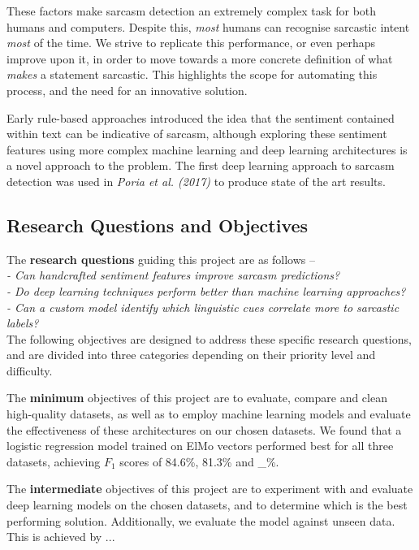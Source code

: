 \documentclass[12pt,a4paper]{article}
\begin{document}
These factors make sarcasm detection an extremely complex task for both humans and computers. Despite this, \textit{most} humans can recognise sarcastic intent \textit{most} of the time. We strive to replicate this performance, or even perhaps improve upon it, in order to move towards a more concrete definition of what \textit{makes} a statement sarcastic. This highlights the scope for automating this process, and the need for an innovative solution.

Early rule-based approaches introduced the idea that the sentiment contained within text can be indicative of sarcasm, although exploring these sentiment features using more complex machine learning and deep learning architectures is a novel approach to the problem. The first deep learning approach to sarcasm detection was used in \textit{Poria et al. (2017)} \cite{poria2016deeper} to produce state of the art results. 

\subsection{Research Questions and Objectives}
\noindent The \textbf{research questions} guiding this project are as follows --\\
\indent \textit{- Can handcrafted sentiment features improve sarcasm predictions?}\\ 
\indent \textit{- Do deep learning techniques perform better than machine learning approaches?}\\ 
\indent \textit{- Can a custom model identify which linguistic cues correlate more to sarcastic labels?}\\

\noindent The following objectives are designed to address these specific research questions, and are divided into three categories depending on their priority level and difficulty.

The \textbf{minimum} objectives of this project are to evaluate, compare and clean high-quality datasets, as well as to employ machine learning models and evaluate the effectiveness of these architectures on our chosen datasets. We found that a logistic regression model trained on ElMo vectors performed best for all three datasets, achieving $F_{1}$ scores of 84.6\%, 81.3\% and \_\%. 

The \textbf{intermediate} objectives of this project are to experiment with and evaluate deep learning models on the chosen datasets, and to determine which is the best performing solution. Additionally, we evaluate the model against unseen data. This is achieved by ...
\end{document}
